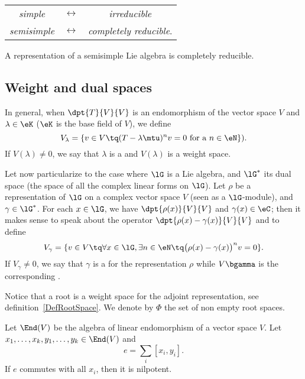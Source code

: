 \begin{center}
	\begin{tabular}{ccc}
		\emph{simple}     & $\leftrightarrow$ & \emph{irreducible}           \\
		\emph{semisimple} & $\leftrightarrow$ & \emph{completely reducible}. \\
	\end{tabular}
\end{center}

\begin{theorem}
	A representation of a semisimple Lie algebra is completely reducible.
\end{theorem}

\subsection{Weight and dual spaces}

In general, when $\dpt{T}{V}{V}$ is an endomorphism of the vector space $V$ and $\lambda\in\eK$ ($\eK$ is the base field of $V$), we define
\begin{equation}
	V_\lambda=\{ v\in V\tq (T-\lambda\mtu)^nv=0\textrm{ for a $n\in\eN$} \}).
\end{equation}
If $V(\lambda)\neq0$, we say that $\lambda$ is a  and $V(\lambda)$ is a weight space.

Let now particularize to the case where $\lG$ is a Lie algebra, and $\lG^*$ its dual space (the space of all the complex linear forms on $\lG$). Let $\rho$ be a representation of $\lG$ on a complex vector space $V$ (seen as a $\lG$-module), and $\gamma\in\lG^*$. For each $x\in\lG$, we have $\dpt{\rho(x)}{V}{V}$ and $\gamma(x)\in\eC$; then it makes sense to speak about the operator $\dpt{\rho(x)-\gamma(x)}{V}{V}$ and to define
\begin{equation}
	V_{\gamma}=\{ v\in V\tq\forall x\in\lG,\exists n\in\eN \tq\big(\rho(x)-\gamma(x)\big)^nv=0 \}.
\end{equation}
If $V_{\gamma}\neq 0$, we say that $\gamma$ is a  for the representation $\rho$ while $V\bgamma$ is the corresponding .

Notice that a root is a weight space for the adjoint representation, see definition~\ref{DefRootSpace}. We denote by $\Phi$ the set of non empty root spaces.

\begin{lemma}

	Let $\End(V)$ be the algebra of linear endomorphism of a vector space $V$. Let $x_1,\ldots,x_k,y_1,\ldots,y_k\in\End(V)$ and
	\[
		e=\sum_i[x_i,y_i].
	\]
	If $e$ commutes with all $x_i$, then it is nilpotent.
	\label{lem:EndV_e}
\end{lemma}

